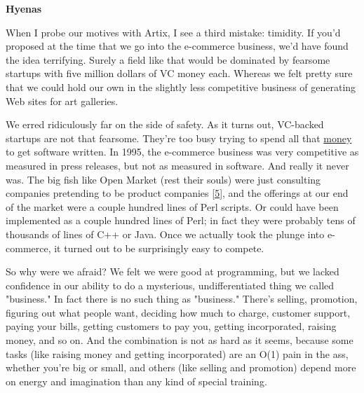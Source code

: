 \textbf{Hyenas}

When I probe our motives with Artix, I see a
                    third mistake: timidity. If you'd proposed at the time that
                    we go into the e-commerce business, we'd have found the idea
                    terrifying. Surely a field like that would be dominated by
                    fearsome startups with five million dollars of VC money
                    each. Whereas we felt pretty sure that we could hold our own
                    in the slightly less competitive business of generating Web
                    sites for art galleries.

We erred ridiculously
                    far on the side of safety. As it turns out, VC-backed
                    startups are not that fearsome. They're too busy trying to
                    spend all that \href{http://www.paulgraham.com/venturecapital.html}{money} to
                    get software written. In 1995, the e-commerce business was
                    very competitive as measured in press releases, but not as
                    measured in software. And really it never was. The big fish
                    like Open Market (rest their souls) were just consulting
                    companies pretending to be product companies
                    [\href{\#f5n}{5}], and the offerings at our end of the market were a couple
                    hundred lines of Perl scripts. Or could have been
                    implemented as a couple hundred lines of Perl; in fact they
                    were probably tens of thousands of lines of C++ or Java.
                    Once we actually took the plunge into e-commerce, it turned
                    out to be surprisingly easy to compete.

So why
                    were we afraid? We felt we were good at programming, but we
                    lacked confidence in our ability to do a mysterious,
                    undifferentiated thing we called "business." In fact there
                    is no such thing as "business." There's selling, promotion,
                    figuring out what people want, deciding how much to charge,
                    customer support, paying your bills, getting customers to
                    pay you, getting incorporated, raising money, and so on. And
                    the combination is not as hard as it seems, because some
                    tasks (like raising money and getting incorporated) are an
                    O(1) pain in the ass, whether you're big or small, and
                    others (like selling and promotion) depend more on energy
                    and imagination than any kind of special training.

